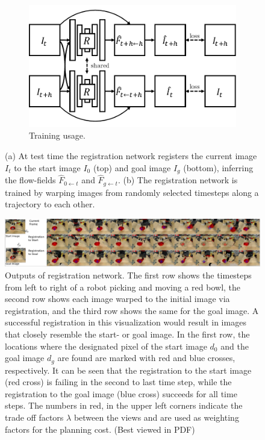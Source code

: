\begin{figure}[t!]
\begin{subfigure}[b]{0.55\linewidth}
		\centering
		\includegraphics[width=\linewidth,trim={0 3mm 0 3mm},clip]{images_rfr/registration_train.pdf}
		\caption{\small{Training usage.}}
		\label{fig:discrete}
	\end{subfigure}
	\vspace{-1mm}
	\caption{\small{(a) At test time the registration network registers the current image $I_t$ to the start image $I_0$ (top) and goal image $I_g$ (bottom), inferring the flow-fields $\hat{F}_{0 \leftarrow t}$ and $\hat{F}_{g \leftarrow t}$. (b) The registration network is trained by warping images from randomly selected timesteps along a trajectory to each other.
	}}
	\label{fig:registration_arch}
\end{figure}

\begin{figure}
	\centering
	\vspace{-0.1in}
	\includegraphics[width=1\linewidth]{images_rfr/reg_over_time.png}
	\caption{\small{Outputs of registration network. The first row shows the timesteps from left to right of a robot picking and moving a red bowl, the second row shows each image warped to the initial image via registration, and the third row shows the same for the goal image. A successful registration in this visualization would result in images that closely resemble the start- or goal image. In the first row, the locations where the designated pixel of the start image $d_0$ and the goal image $d_g$ are found are marked with red and blue crosses, respectively. It can be seen that the registration to the start image (red cross) is failing in the second to last time step, while the registration to the goal image (blue cross) succeeds for all time steps. The numbers in red, in the upper left corners indicate the trade off factors $\lambda$ between the views and are used as weighting factors for the planning cost. (Best viewed in PDF)}}
	\label{fig:tracking_overtime}
	\vspace{-0.2in}
\end{figure}

